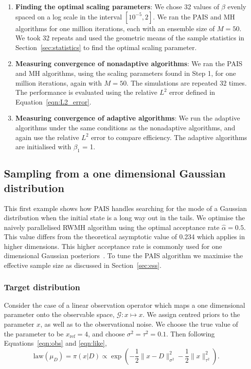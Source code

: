 \documentclass[final]{siamltex}
\newcommand{\G}{\mathcal{G}}
\begin{document}
\begin{enumerate}
	\item {\bf Finding the optimal scaling parameters}: We chose 32 values of $\beta$ evenly spaced on a log scale in the interval $[10^{-5}, 2]$. We ran the PAIS and MH algorithms for one million iterations, each with an ensemble size of $M=50$. We took 32 repeats and used the geometric means of the sample statistics in Section~\ref{sec:statistics} to find the optimal scaling parameter.
	\item {\bf Measuring convergence of nonadaptive algorithms}: We ran the PAIS and MH algorithms, using the scaling parameters found in Step 1, for one million iterations, again with $M=50$. The simulations are repeated 32 times. The performance is evaluated using the relative $L^2$ error defined in Equation~\eqref{eqn:L2_error}.
	\item {\bf Measuring convergence of adaptive algorithms}: We run the
adaptive algorithms under the same conditions as the nonadaptive
algorithms, and again use the relative $L^2$ error to compare
efficiency. The adaptive algorithms are initialised with $\beta_1$ = 1.
\end{enumerate}


\subsection{Sampling from a one dimensional Gaussian distribution}
\label{sec:problem 1}

This first example shows how PAIS handles searching for the mode of a
Gaussian distribution when the initial state is a long way out in the
tails. We optimise the
naively parallelised RWMH algorithm using the optimal acceptance rate
$\hat{\alpha} = 0.5$. This value differs from the theoretical
asymptotic value of 0.234 which applies in higher dimensions. This
higher acceptance rate is commonly used for one dimensional Gaussian
posteriors~\cite{rosenthal2011optimal}. To tune the
PAIS algorithm we maximise the effective sample size as
discussed in Section~\ref{sec:ess}.


\subsubsection{Target distribution}

Consider the case of a linear observation operator which maps a one
dimensional parameter onto the observable space, $\G\colon x \mapsto
x$. We assign centred priors to the parameter $x$, as well as to the
observational noise. We choose the true value of the parameter to be
$x_\text{ref} = 4$, and choose $\sigma^2=\tau^2=0.1$. Then
following Equations~\eqref{eqn:obs} and \eqref{eqn:like},
\begin{equation}\label{eqn:Gaussian posterior}
	\text{law}(\mu_D) = \pi(x|D) \propto \exp\left(-\frac{1}{2}\big\|x
	 - D\big\|^2_{\sigma^2} - \frac{1}{2}\big\|x\big\|^2_{\tau^2}\right).
\end{equation}
\end{document}
